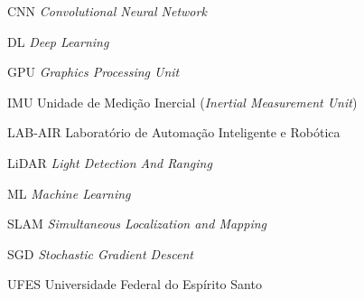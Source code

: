 \documentclass[
	12pt,				%
	openright,			%
	oneside,			%
	a4paper,			%
	chapter=TITLE,		%
	english,			%
	french,				%
	spanish,			%
	brazil				%
	]{abntex2}
\begin{document}
\begin{siglas}
\item[CNN] \textit{Convolutional Neural Network}
\item [DL] \textit{Deep Learning}
\item[GPU] \textit{Graphics Processing Unit} 
\item[IMU]  Unidade de Medição Inercial (\textit{Inertial Measurement Unit})
\item[LAB-AIR] Laboratório de Automação Inteligente e Robótica
\item[LiDAR] \textit{Light Detection And Ranging}
\item[ML] \textit{Machine Learning}
\item[SLAM] \textit{Simultaneous Localization and Mapping}
\item[SGD] \textit{Stochastic Gradient Descent}
\item[UFES] Universidade Federal do Espírito Santo
\end{siglas}



\end{document}
